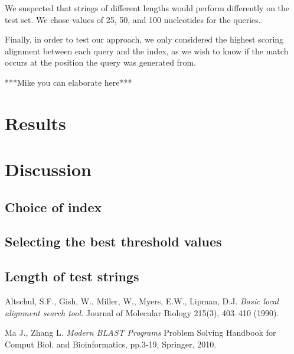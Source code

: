 \documentclass[12pt]{article}%
\begin{document}
We suspected that strings of different lengths would perform differently on the test set. We chose values of 25, 50, and 100 nucleotides for the queries. 

Finally, in order to test our approach, we only considered the highest scoring alignment between each query and the index, as we wish to know if the match occurs at the position the query was generated from.


***Mike you can elaborate here***

\section{Results}

\section{Discussion}

\subsection{Choice of index}

\subsection{Selecting the best threshold values}

\subsection{Length of test strings}


\begin{thebibliography}{9}

Altschul, S.F., Gish, W., Miller, W., Myers, E.W., Lipman, D.J. 
\emph{Basic local alignment search tool. }
Journal of Molecular Biology 215(3), 403–410 (1990).

Ma J., Zhang L.
\emph{Modern BLAST Programs}
Problem Solving Handbook for Comput Biol. and Bioinformatics, pp.3-19, Springer, 2010.


\end{thebibliography}
\end{document}
